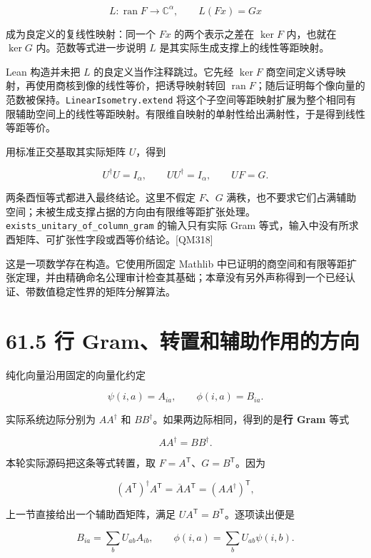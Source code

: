 \documentclass[
  11pt,
  oneside]{book}
\begin{document}
\[
L:\operatorname{ran}F\longrightarrow\mathbb C^\alpha,
\qquad L(Fx)=Gx
\]

成为良定义的复线性映射：同一个 \(Fx\) 的两个表示之差在 \(\ker F\)
内，也就在 \(\ker G\) 内。范数等式进一步说明 \(L\)
是其实际生成支撑上的线性等距映射。

Lean 构造并未把 \(L\) 的良定义当作注释跳过。它先经 \(\ker F\)
商空间定义诱导映射，再使用商核到像的线性等价，把诱导映射转回
\(\operatorname{ran}F\)；随后证明每个像向量的范数被保持。\texttt{LinearIsometry.extend}
将这个子空间等距映射扩展为整个相同有限辅助空间上的线性等距映射。有限维自映射的单射性给出满射性，于是得到线性等距等价。

用标准正交基取其实际矩阵 \(U\)，得到

\[
U^\dagger U=I_\alpha,\qquad UU^\dagger=I_\alpha,
\qquad UF=G.
\]

两条酉恒等式都进入最终结论。这里不假定 \(F\)、\(G\)
满秩，也不要求它们占满辅助空间；未被生成支撑占据的方向由有限维等距扩张处理。\texttt{exists\_\allowbreak unitary\_\allowbreak of\_\allowbreak column\_\allowbreak gram}
的输入只有实际 Gram
等式，输入中没有所求酉矩阵、可扩张性字段或酉等价结论。{[}QM318{]}

这是一项数学存在构造。它使用所固定 Mathlib
中已证明的商空间和有限等距扩张定理，并由精确命名公理审计检查其基础；本章没有另外声称得到一个已经认证、带数值稳定性界的矩阵分解算法。

\hypertarget{ux884c-gramux8f6cux7f6eux548cux8f85ux52a9ux4f5cux7528ux7684ux65b9ux5411}{%
\section{61.5 行
Gram、转置和辅助作用的方向}\label{ux884c-gramux8f6cux7f6eux548cux8f85ux52a9ux4f5cux7528ux7684ux65b9ux5411}}

纯化向量沿用固定的向量化约定

\[
\psi(i,a)=A_{ia},\qquad\phi(i,a)=B_{ia}.
\]

实际系统边际分别为 \(AA^\dagger\) 和
\(BB^\dagger\)。如果两边际相同，得到的是\textbf{行 Gram} 等式

\[
AA^\dagger=BB^\dagger.
\]

本轮实际源码把这条等式转置，取
\(F=A^\mathsf T\)、\(G=B^\mathsf T\)。因为

\[
(A^\mathsf T)^\dagger A^\mathsf T
=\overline A A^\mathsf T=(AA^\dagger)^\mathsf T,
\]

上一节直接给出一个辅助酉矩阵，满足
\(UA^\mathsf T=B^\mathsf T\)。逐项读出便是

\[
B_{ia}=\sum_bU_{ab}A_{ib},
\qquad
\phi(i,a)=\sum_bU_{ab}\psi(i,b).
\]
\end{document}
